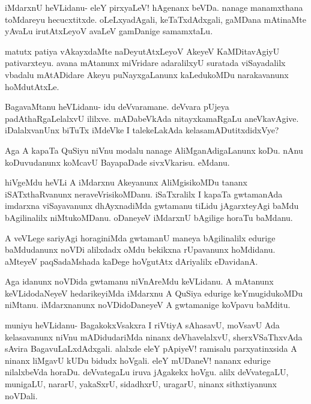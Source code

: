 \documentclass{article}
\begin{document}
\begin{mng}%
iMdarxnU heVLidanu- eleY pirxyaLeV! hAgenanx beVDa. nanage
manamxthana toMdareyu hecucxtitxde. oLeLxyadAgali, keTaTxdAdxgali, gaMDana
mAtinaMte yAvaLu irutAtxLeyoV avaLeV gamDanige samamxtaLu.
\end{mng}

\begin{mng}%
matutx patiya vAkayxdaMte naDeyutAtxLeyoV AkeyeV KaMDitavAgiyU
pativarxteyu. avana mAtanunx miVridare adaralilxyU suratada
viSayadalilx vbadalu mAtADidare Akeyu puNayxgaLanunx kaLedukoMDu narakavanunx
hoMdutAtxLe.
\end{mng}

\begin{mng}%
BagavaMtanu heVLidanu- idu deVvaramane. deVvara pUjeya
padAthaRgaLelalxvU ililxve. mADabeVkAda nitayxkamaRgaLu aneVkavAgive.
iDalalxvanUnx biTuTx iMdeVke I talekeLakAda kelasamADutitxdidxVye?
\end{mng}

\begin{mng}%
Aga A kapaTa QuSiyu niVnu modalu nanage AliMganAdigaLanunx
koDu. nAnu koDuvudanunx koMcavU BayapaDade sivxVkarisu. eMdanu.
\end{mng}

\begin{mng}%
hiVgeMdu heVLi A iMdarxnu Akeyanunx AliMgisikoMDu
tananx iSATxthaRvanunx neraveVrisikoMDanu. iSaTxralilx I kapaTa gwtamanAda
imdarxna viSayavanunx dhAyxnadiMda gwtamanu tiLidu jAgarxteyAgi baMdu
bAgilinalilx niMtukoMDanu. oDaneyeV iMdarxnU bAgilige horaTu baMdanu.
\end{mng}

\begin{mng}%
A veVLege sariyAgi horaginiMda gwtamanU maneya bAgilinalilx
edurige baMdudanunx noVDi alilxdadx oMdu bekikxna rUpavanunx hoMdidanu.
aMteyeV paqSadaMshada kaDege hoVgutAtx dAriyalilx eDavidanA.
\end{mng}

\begin{mng}%
Aga idanunx noVDida gwtamanu niVnAreMdu keVLidanu. A 
mAtanunx keVLidodaNeyeV hedarikeyiMda iMdarxnu A QuSiya edurige
keYmugidukoMDu niMtanu. iMdarxnanunx noVDidoDaneyeV A gwtamanige
koVpavu baMditu.
\end{mng}

\begin{mng}%
muniyu heVLidanu- BagakokxVsakxra I riVtiyA sAhasavU,
moVsavU Ada kelasavanunx niVnu mADidudariMda ninanx deVhavelalxvU,
sherxVSaThxvAda sAvira BagavuLaLxdAdxgali. alalxde eleY pApiyeV! ramisalu
parxyatinxsida A ninanx liMgavU kUDu bidudx hoVgali. eleY mUDaneV! nananx
edurige nilalxbeVda horaDu. deVvategaLu iruva jAgakekx hoVgu. alilx
deVvategaLU, munigaLU, nararU, yakaSxrU, sidadhxrU, uragarU, ninanx
sithxtiyanunx noVDali.
\end{mng}
\end{document}
